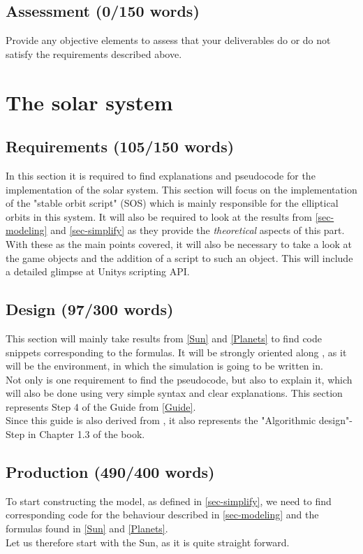 \documentclass[conference,compsoc]{IEEEtran}
\begin{document}
\subsection{Assessment (0/150 words)}
Provide any objective elements to assess that your deliverables do or do not satisfy the requirements described above. 

\section{The solar system}
\label{sec-solar-system}
\subsection{Requirements (105/150 words)}
In this section it is required to find explanations and pseudocode for the implementation of the solar system. This section will focus on the implementation of the "stable orbit script" (SOS) which is mainly responsible for the elliptical orbits in this system. It will also be required to look at the results from \ref{sec-modeling} and \ref{sec-simplify} as they provide the \emph{theoretical} aspects of this part. With these as the main points covered, it will also be necessary to take a look at the game objects and the addition of a script to such an object. This will include a detailed glimpse at Unitys scripting API. 
\subsection{Design (97/300 words)}
This section will mainly take results from \ref{Sun} and \ref{Planets} to find code snippets corresponding to the formulas. It will be strongly oriented along \cite{UnityDoc}, as it will be the environment, in which the simulation is going to be written in. \\
Not only is one requirement to find the pseudocode, but also to explain it, which will also be done using very simple syntax and clear explanations. This section represents Step 4 of the Guide from \ref{Guide}. \\ Since this guide is also derived from \cite{ComputationalModelsIntroduction}, it also represents the "Algorithmic design"-Step in Chapter 1.3 of the book. 
\subsection{Production (490/400 words)}
To start constructing the model, as defined in \ref{sec-simplify}, we need to find corresponding code for the behaviour described in \ref{sec-modeling} and the formulas found in \ref{Sun} and \ref{Planets}. \\
Let us therefore start with the Sun, as it is quite straight forward.
\end{document}
